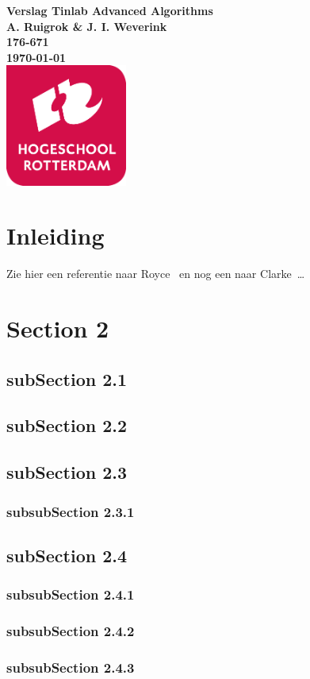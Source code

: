 \documentclass{article}
\begin{document}
\sffamily
\begin{titlepage}
  \centering
    \vfill
    {\bfseries\Huge
      Verslag Tinlab Advanced Algorithms \\
        \vskip2cm
      }
      {\bfseries\Large
        A. Ruigrok \& J. I. Weverink\\
      }
      {
        \bfseries\normalsize
        176-671\\
        \vskip1cm
        \today\\
    }
    \vfill
    \includegraphics[width=4cm]{logohr.png} %
    \vfill
    \vfill
\end{titlepage}
\newpage
\tableofcontents

\newpage
\section{Inleiding}
Zie hier een referentie naar Royce~\cite{royce1987managing} en nog een naar Clarke~\cite{modelchecking}\ldots 

\section{Section 2}
\subsection{subSection 2.1}
\subsection{subSection 2.2}
\subsection{subSection 2.3}
\subsubsection{subsubSection 2.3.1}
\subsection{subSection 2.4}
\subsubsection{subsubSection 2.4.1}
\subsubsection{subsubSection 2.4.2}
\subsubsection{subsubSection 2.4.3}



\newpage

\newpage


\end{document}
